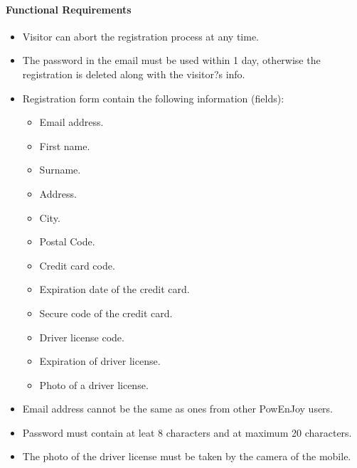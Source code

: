 \paragraph{Functional Requirements}
\begin{itemize}
	\item Visitor can abort the registration process at any time.
	\item The password in the email must be used within 1 day, otherwise the registration is deleted along with the visitor?s info.
	\item Registration form contain the following information (fields):
	\begin{itemize}
		\item Email address.
		\item First name.
		\item Surname.
		\item Address.
		\item City.
		\item Postal Code.
		\item Credit card code.
		\item Expiration date of the credit card.
		\item Secure code of the credit card.
		\item Driver license code.
		\item Expiration of driver license.
		\item Photo of a driver license.
	\end{itemize}
	\item Email address cannot be the same as ones from other PowEnJoy users.
	\item Password must contain at leat 8 characters and at maximum 20 characters.
	\item The photo of the driver license must be taken by the camera of the mobile.
\end{itemize}